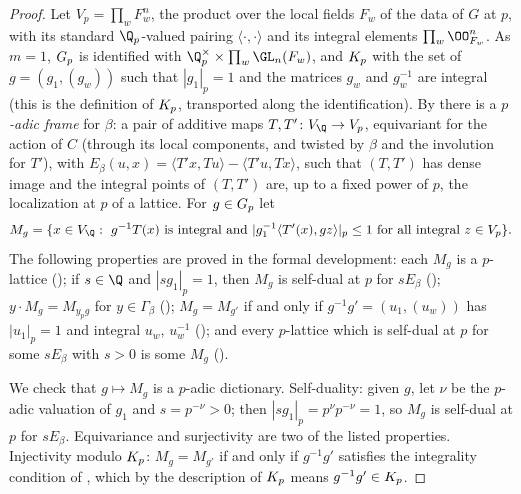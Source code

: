 \begin{proof}
Let $V_p=\prod_wF_w^n$, the product over the local fields $F_w$ of the data of $G$ at $p$, with its
standard $\Q_p$-valued pairing $\langle\cdot,\cdot\rangle$ and its integral elements
$\prod_w\OO_{F_w}^n$. As $m=1$, $G_{p}$ is identified with $\Q_p^\times\times\prod_w\GL_n(F_w)$,
and $K_{p}$ with the set of $g=(g_1,(g_w))$ such that $|g_1|_p=1$ and the matrices $g_w$ and
$g_w^{-1}$ are integral (this is the definition of $K_{p}$, transported along the
identification). By
 there is a \emph{$p$-adic frame} for $\beta$: a pair of
additive maps $T,T'\colon V_\Q\to V_p$, equivariant for the action of $C$ (through its local
components, and twisted by $\beta$ and the involution for $T'$), with
$E_\beta(u,x)=\langle T'x,Tu\rangle-\langle T'u,Tx\rangle$, such that $(T,T')$ has dense image and the
integral points of $(T,T')$ are, up to a fixed power of $p$, the localization at $p$ of a lattice. For
$g\in G_{p}$ let
\[
M_g=\{x\in V_\Q:\ g^{-1}T(x)\text{ is integral and }|g_1^{-1}\langle T'(x),gz\rangle|_p\le1\text{ for
all integral }z\in V_p\}.
\]
The following properties are proved in the formal development: each $M_g$ is a $p$-lattice
(); if $s\in\Q$ and $|sg_1|_p=1$, then $M_g$ is self-dual at
$p$ for $sE_\beta$ (); $y\cdot M_g=M_{y_pg}$ for
$y\in\Gamma_\beta$ (); $M_g=M_{g'}$ if and only if
$g^{-1}g'=(u_1,(u_w))$ has $|u_1|_p=1$ and integral $u_w$, $u_w^{-1}$
(); and every $p$-lattice which is self-dual at $p$ for some
$sE_\beta$ with $s>0$ is some $M_g$ ().

We check that $g\mapsto M_g$ is a $p$-adic dictionary. Self-duality: given $g$, let $\nu$ be the
$p$-adic valuation of $g_1$ and $s=p^{-\nu}>0$; then $|sg_1|_p=p^{\nu}p^{-\nu}=1$, so $M_g$ is self-dual
at $p$ for $sE_\beta$. Equivariance and surjectivity are two of the listed properties. Injectivity
modulo $K_{p}$: $M_g=M_{g'}$ if and only if $g^{-1}g'$ satisfies the integrality condition of
, which by the description of $K_{p}$ means
$g^{-1}g'\in K_{p}$.
\end{proof}

